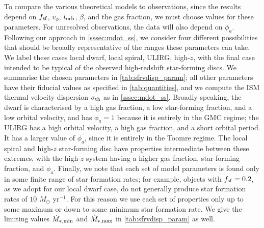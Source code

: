 \documentclass[useAMS,usenatbib]{mn2e}
\begin{document}
To compare the various theoretical models to observations, since the results depend on $f_{\rm sf}$, $v_\phi$, $t_{\rm orb}$, $\beta$, and the gas fraction, we must choose values for these parameters. For unresolved observations, the data will also depend on $\phi_a$. Following our approach in \autoref{sssec:mdot_ss}, we consider four different possibilities that should be broadly representative of the ranges these parameters can take. We label these cases local dwarf, local spiral, ULIRG, high-$z$, with the final case intended to be typical of the observed high-redshift star-forming discs. We summarise the chosen parameters in \autoref{tab:sfrvdisp_param}; all other parameters have their fiducial values as specified in \autoref{tab:quantities}, and we compute the ISM thermal velocity dispersion $\sigma_{\rm th}$ as in \autoref{sssec:mdot_ss}. Broadly speaking, the dwarf is characterised by a high gas fraction, a low star-forming fraction, and a low orbital velocity, and has $\phi_a = 1$ because it is entirely in the GMC regime; the ULIRG has a high orbital velocity, a high gas fraction, and a short orbital period. It has a larger value of $\phi_a$, since it is entirely in the Toomre regime. The local spiral and high-$z$ star-forming disc have properties intermediate between these extremes, with the high-$z$ system having a higher gas fraction, star-forming fraction, and $\phi_a$. Finally, we note that each set of model parameters is found only in some finite range of star formation rates; for example, objects with $f_{\rm sf} = 0.2$, as we adopt for our local dwarf case, do not generally produce star formation rates of $10$ $M_\odot$ yr$^{-1}$. For this reason we use each set of properties only up to some maximum or down to some minimum star formation rate. We give the limiting values $\dot{M}_{*,\rm min}$ and $\dot{M}_{*,\rm max}$ in \autoref{tab:sfrvdisp_param} as well.
\end{document}
